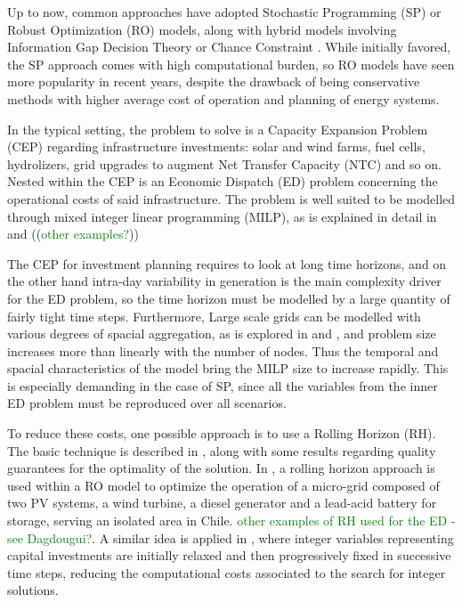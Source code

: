Up to now, common approaches have adopted Stochastic Programming (SP) or Robust Optimization (RO) models, along with hybrid
 models involving Information Gap Decision Theory or Chance Constraint \textcolor{green}{\cite{review_math_opt}}. 
While initially favored, the SP approach comes with high computational burden, so RO models have seen more popularity 
in recent years, despite the drawback of being conservative methods with higher average cost of operation and planning of energy systems.

In the typical setting, the problem to solve is a Capacity Expansion Problem (CEP) regarding infrastructure investments:
 solar and wind farms, fuel cells, hydrolizers, grid upgrades to augment Net Transfer Capacity (NTC) and so on. 
Nested within the CEP is an Economic Dispatch (ED) problem concerning the operational costs of said infrastructure. 
The problem is well suited to be modelled through mixed integer linear programming (MILP), as is explained in detail in 
\textcolor{green}{\cite{INTRO_isolated_MIP}} and ((\textcolor{Green}{other examples?}))

The CEP for investment planning requires to look at long time horizons, and on the other hand intra-day variability in generation is the main complexity driver for the ED problem, so the time horizon must be modelled by a large quantity of fairly tight time steps. 
Furthermore, Large scale grids can be modelled with various degrees of spacial aggregation, as is explored in \cite{Horsch} and \cite{BIENER2020106349}, and problem size increases more than linearly with the number of nodes.
Thus the temporal and spacial characteristics of the model bring the MILP size to increase rapidly. 
This is especially demanding in the case of SP, since all the variables from the inner ED problem must be reproduced over all scenarios.

To reduce these costs, one possible approach is to use a Rolling Horizon (RH). 
The basic technique is described in \textcolor{green}{\cite{INTRO_Glomb}}, along with some results regarding quality guarantees for the optimality of the solution. 
In \textcolor{green}{\cite{INTRO_Palma-Behnke}}, a rolling horizon approach is used within a RO model to optimize the operation of a micro-grid composed of two PV systems, a wind turbine, a diesel generator and a lead-acid battery for storage, serving an isolated area in Chile. 
\textcolor{Green}{other examples of RH used for the ED - see Dagdougui?}. 
A similar idea is applied in \textcolor{green}{\cite{INTRO_karlsruhe}}, 
where integer variables representing capital investments are initially relaxed 
and then progressively fixed in successive time steps, reducing the computational
 costs associated to the search for integer solutions.

